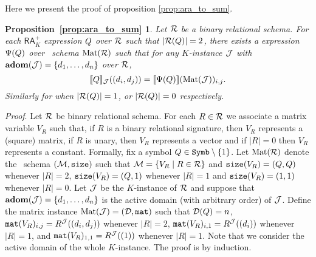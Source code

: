 \newtheorem*{ARATOSUM}{Proposition~\ref{prop:ara_to_sum}}

Here we present the proof of proposition \ref{prop:ara_to_sum}.

\begin{ARATOSUM}
  Let $\mathcal{R}$ be a binary relational schema. For each $\mathsf{RA}_{K}^+$  expression $Q$ over $\mathcal{R}$  such that $|\mathcal{R}(Q)| = 2$, there exists a \langsum  expression $\Psi(Q)$ over \lang \ schema $\text{Mat}(\mathcal{R})$ such that for any $K$-instance $\mathcal{J}$ with $\mathbf{adom}(\mathcal{J}) = \{d_1, \ldots, d_n\}$ over $\mathcal{R}$,
	$$
	\llbracket Q \rrbracket_{\mathcal{J}}((d_i, d_j))=\llbracket \Psi(Q) \rrbracket(\text{Mat}(\mathcal{J}))_{i,j}.
	$$
	Similarly for when $|\mathcal{R}(Q)| = 1$, or $|\mathcal{R}(Q)| = 0$ respectively.
\end{ARATOSUM}

\textit{Proof}. Let $\mathcal{R}$ be binary relational schema. For each $R\in \mathcal{R}$ we associate a matrix variable 
$V_R$ such that, if $R$ is a binary relational signature, then $V_R$ represents a (square) matrix, 
if $R$ is unary, then $V_R$ represents a vector and if $|R|=0$ then $V_R$ represents a constant. Formally, 
fix a symbol $Q \in \texttt{Symb} \setminus \{1\}$. Let $\text{Mat}(\mathcal{R})$ denote the \lang \ schema
$(\mathcal{M},\texttt{size})$ such that $\mathcal{M} = \{ V_R \mid R \in \mathcal{R}\}$ and $\texttt{size}(V_R) = (Q, Q)$ 
whenever $|R| = 2$, $\texttt{size}(V_R) = (Q, 1)$ whenever $|R|=1$ and $\texttt{size}(V_R) = (1, 1)$ whenever $|R|=0$. 
Let $\mathcal{J}$ be the $K$-instance of $\mathcal{R}$ and suppose that $\mathbf{adom}(\mathcal{J}) = \{d_1, \ldots, d_n\}$ is 
the active domain (with arbitrary order) of $\mathcal{J}$. 
Define the matrix instance $\text{Mat}(\mathcal{J}) = (\mathcal{D},\texttt{mat})$ such 
that $\mathcal{D}(Q) = n$, $\texttt{mat}(V_R)_{i,j} = R^{\mathcal{J}}((d_i, d_j))$ whenever $|R|=2$, $\texttt{mat}(V_R)_{i,1} = R^{\mathcal{J}}((d_i))$ 
whenever $|R|=1$, and $\texttt{mat}(V_R)_{1,1} = R^{\mathcal{J}}((1))$ whenever $|R|=1$. 
Note that we consider the active domain of the whole $K$-instance.
The proof is by induction.

